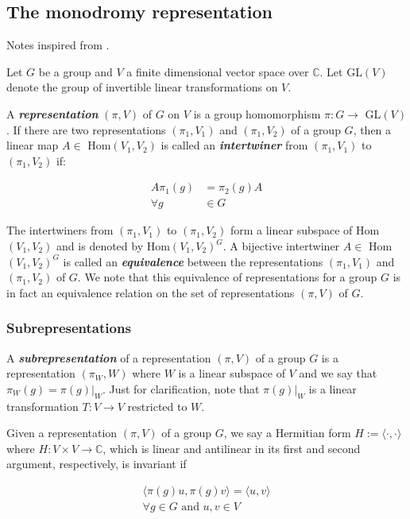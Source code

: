 \documentclass{article}
\theoremstyle{definition}
\newcommand{\CC}{\mathbb{C}}
\newcommand{\newword}[1]{\textbf{\emph{#1}}}
\begin{document}
\subsection{The monodromy representation}
Notes inspired from \cite{tsinghua_hypergeometric}.

Let $G$ be a group and $V$ a finite dimensional vector space over $\CC$. Let GL$(V)$ denote the group of invertible linear transformations on $V$.

A \newword{representation} $(\pi, V)$ of $G$ on $V$ is a group homomorphism $\pi: G \to$ GL$(V)$. If there are two representations $(\pi_1, V_1)$ and $(\pi_1, V_2)$ of a group $G$, then a linear map $A \in$ Hom$(V_1, V_2)$ is called an \newword{intertwiner} from $(\pi_1, V_1)$ to $(\pi_1, V_2)$ if:

\begin{align*}
    A\pi_1(g) &= \pi_2(g)A\\
    \forall g &\in G
\end{align*}

The intertwiners from $(\pi_1, V_1)$ to $(\pi_1, V_2)$ form a linear subspace of Hom$(V_1, V_2)$ and is denoted by Hom$(V_1, V_2)^G$. A bijective intertwiner $A \in $ Hom$(V_1, V_2)^G$ is called an \newword{equivalence} between the representations $(\pi_1, V_1)$ and $(\pi_1, V_2)$ of $G$. We note that this equivalence of representations for a group $G$ is in fact an equivalence relation on the set of representations $(\pi, V)$ of $G$.

\subsubsection{Subrepresentations}
A \newword{subrepresentation} of a representation $(\pi, V)$ of a group $G$ is a representation $(\pi_W, W)$ where $W$ is a linear subspace of $V$ and we say that $\pi_{W}(g) = \pi(g)|_W$. Just for clarification, note that $\pi(g)|_W$ is a linear transformation $T: V \to V$ restricted to $W$. 

Given a representation $(\pi, V)$ of a group $G$, we say a Hermitian form $H := \langle \cdot, \cdot \rangle$ where $H: V \times V \to \CC$, which is linear and antilinear in its first and second argument, respectively, is invariant if 

\begin{align*}
    \langle \pi(g)u, \pi(g)v \rangle = \langle u, v \rangle\\
    \forall g \in G \text{ and } u,v \in V
\end{align*}
\end{document}

